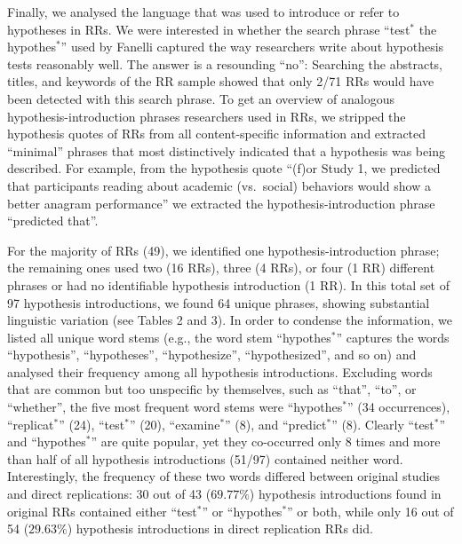 \documentclass[british,,man,floatsintext]{apa6}
\begin{document}
Finally, we analysed the language that was used to introduce or refer to hypotheses in RRs.
We were interested in whether the search phrase \enquote{test\(^\ast\) the hypothes\(^\ast\)} used by Fanelli captured the way researchers write about hypothesis tests reasonably well. The answer is a resounding \enquote{no}:
Searching the abstracts, titles, and keywords of the RR sample showed that only 2/71 RRs would have been detected with this search phrase.
To get an overview of analogous hypothesis-introduction phrases researchers used in RRs, we stripped the hypothesis quotes of RRs from all content-specific information and extracted \enquote{minimal} phrases that most distinctively indicated that a hypothesis was being described.
For example, from the hypothesis quote \enquote{(f)or Study 1, we predicted that participants reading about academic (vs.~social) behaviors would show a better anagram performance} we extracted the hypothesis-introduction phrase \enquote{predicted that}.

For the majority of RRs (49), we identified one hypothesis-introduction phrase; the remaining ones used two (16 RRs), three (4 RRs), or four (1 RR) different phrases or had no identifiable hypothesis introduction (1 RR).
In this total set of 97 hypothesis introductions, we found 64 unique phrases, showing substantial linguistic variation (see Tables 2 and 3).
In order to condense the information, we listed all unique word stems (e.g., the word stem \enquote{hypothes\(^\ast\)} captures the words \enquote{hypothesis}, \enquote{hypotheses}, \enquote{hypothesize}, \enquote{hypothesized}, and so on) and analysed their frequency among all hypothesis introductions.
Excluding words that are common but too unspecific by themselves, such as \enquote{that}, \enquote{to}, or \enquote{whether}, the five most frequent word stems were \enquote{hypothes\(^\ast\)} (34 occurrences), \enquote{replicat\(^\ast\)} (24), \enquote{test\(^\ast\)} (20), \enquote{examine\(^\ast\)} (8), and \enquote{predict\(^\ast\)} (8).
Clearly \enquote{test\(^\ast\)} and \enquote{hypothes\(^\ast\)} are quite popular, yet they co-occurred only 8 times and more than half of all hypothesis introductions (51/97) contained neither word. Interestingly, the frequency of these two words differed between original studies and direct replications: 30 out of 43 (\(69.77\%\)) hypothesis introductions found in original RRs contained either \enquote{test\(^\ast\)} or \enquote{hypothes\(^\ast\)} or both, while only 16 out of 54 (\(29.63\%\)) hypothesis introductions in direct replication RRs did.
\end{document}
